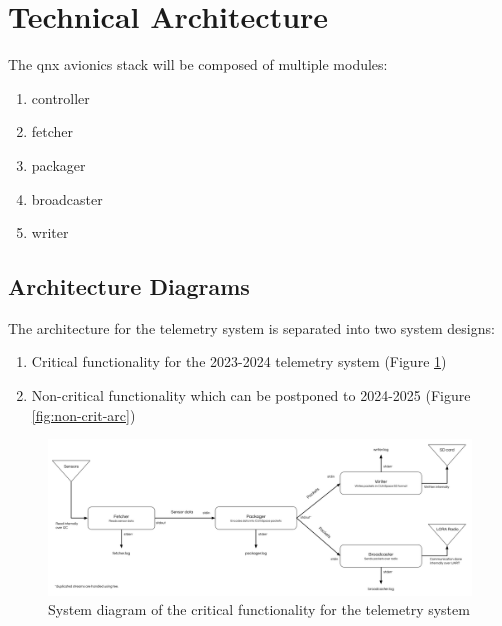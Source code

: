 \section{Technical Architecture}

The \gls{qnx} avionics stack will be composed of multiple modules:

\begin{enumerate}
    \setlength{\itemsep}{1pt}
    \setlength{\parskip}{0pt} \setlength{\parsep}{0pt}
    \item controller
    \item fetcher
    \item packager
    \item broadcaster
    \item writer
\end{enumerate}

\subsection{Architecture Diagrams}

The architecture for the  telemetry system is separated into two system designs:
\begin{enumerate}
    \setlength{\itemsep}{1pt}
    \setlength{\parskip}{0pt} \setlength{\parsep}{0pt}
    \item Critical functionality for the 2023-2024 telemetry system (Figure \ref{fig:crit-arc})
    \item Non-critical functionality which can be postponed to 2024-2025 (Figure \ref{fig:non-crit-arc})
\end{enumerate}

\begin{figure}[H]
    \includegraphics[width=\linewidth]{assets/critical-architecture.png}
    \caption{System diagram of the critical functionality for the telemetry system}
    \label{fig:crit-arc}
\end{figure}

